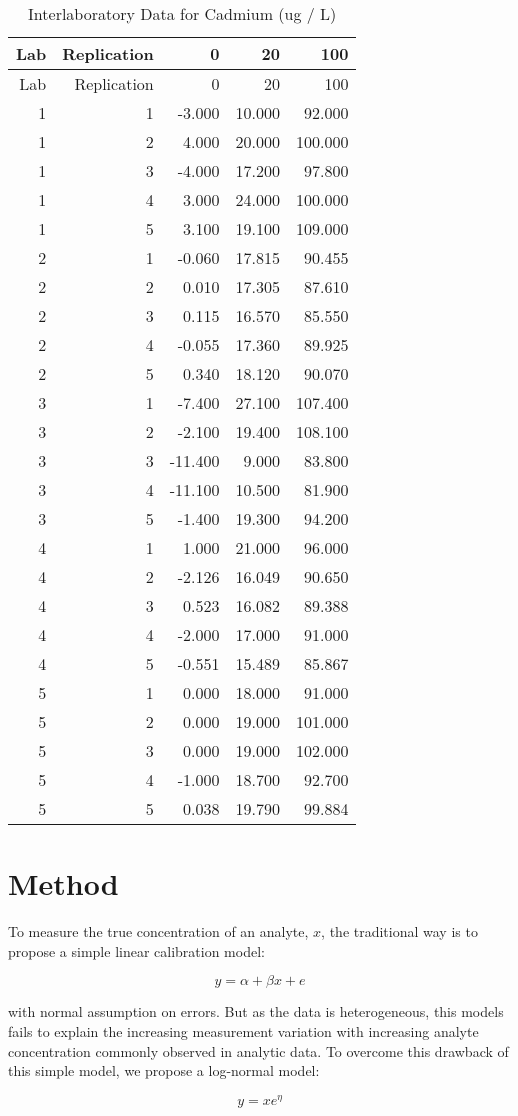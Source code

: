 \documentclass[12pt,]{article}
\begin{document}
\begin{longtable}[]{@{}rrrrr@{}}
\caption{Interlaboratory Data for Cadmium (ug / L)}\tabularnewline
\toprule
Lab & Replication & 0 & 20 & 100\tabularnewline
\midrule
\endfirsthead
\toprule
Lab & Replication & 0 & 20 & 100\tabularnewline
\midrule
\endhead
1 & 1 & -3.000 & 10.000 & 92.000\tabularnewline
1 & 2 & 4.000 & 20.000 & 100.000\tabularnewline
1 & 3 & -4.000 & 17.200 & 97.800\tabularnewline
1 & 4 & 3.000 & 24.000 & 100.000\tabularnewline
1 & 5 & 3.100 & 19.100 & 109.000\tabularnewline
2 & 1 & -0.060 & 17.815 & 90.455\tabularnewline
2 & 2 & 0.010 & 17.305 & 87.610\tabularnewline
2 & 3 & 0.115 & 16.570 & 85.550\tabularnewline
2 & 4 & -0.055 & 17.360 & 89.925\tabularnewline
2 & 5 & 0.340 & 18.120 & 90.070\tabularnewline
3 & 1 & -7.400 & 27.100 & 107.400\tabularnewline
3 & 2 & -2.100 & 19.400 & 108.100\tabularnewline
3 & 3 & -11.400 & 9.000 & 83.800\tabularnewline
3 & 4 & -11.100 & 10.500 & 81.900\tabularnewline
3 & 5 & -1.400 & 19.300 & 94.200\tabularnewline
4 & 1 & 1.000 & 21.000 & 96.000\tabularnewline
4 & 2 & -2.126 & 16.049 & 90.650\tabularnewline
4 & 3 & 0.523 & 16.082 & 89.388\tabularnewline
4 & 4 & -2.000 & 17.000 & 91.000\tabularnewline
4 & 5 & -0.551 & 15.489 & 85.867\tabularnewline
5 & 1 & 0.000 & 18.000 & 91.000\tabularnewline
5 & 2 & 0.000 & 19.000 & 101.000\tabularnewline
5 & 3 & 0.000 & 19.000 & 102.000\tabularnewline
5 & 4 & -1.000 & 18.700 & 92.700\tabularnewline
5 & 5 & 0.038 & 19.790 & 99.884\tabularnewline
\bottomrule
\end{longtable}

\section{Method}\label{method}

To measure the true concentration of an analyte, \(x\), the traditional
way is to propose a simple linear calibration model:

\begin{equation}
y = \alpha + \beta x + e
\end{equation}

with normal assumption on errors. But as the data is heterogeneous, this
models fails to explain the increasing measurement variation with
increasing analyte concentration commonly observed in analytic data. To
overcome this drawback of this simple model, we propose a log-normal
model:

\begin{equation}
y = x e^\eta
\end{equation}
\end{document}
